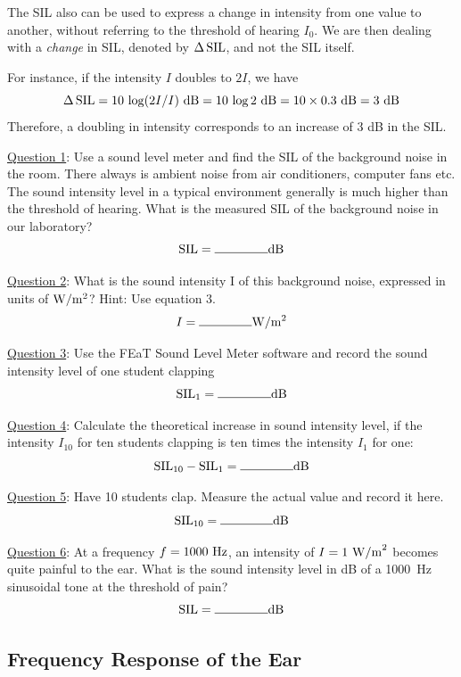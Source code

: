 \documentclass[11pt]{NSF}
\def\be{\begin{equation}}
\def\ee{\end{equation}}
\begin{document}
The SIL also can be used to express a change in intensity from one 
value to another, without referring to the threshold of hearing $I_0$. 
We are then dealing with a {\em change} in SIL, denoted by 
$\Delta\,{\rm SIL}$, and not the SIL itself. 

For instance, if the intensity $I$ doubles to $2I$, we have
%
\be
\Delta\,{\rm SIL} = 10\,\log (2I/I)~{\rm dB}
= 10\,\log 2~{\rm dB} 
= 10\times 0.3~{\rm dB} 
= 3~{\rm dB}
\ee
Therefore, a doubling in intensity corresponds to an increase of 3 dB in the SIL.


\underline{Question 1}: Use a sound level meter and find the SIL of the background noise in the room. There always is
ambient noise from air conditioners, computer fans etc. The sound intensity level in a typical
environment generally is much higher than the threshold of hearing. What is the measured SIL of
the background noise in our laboratory? 
$${\rm SIL}=\rule{1.5cm}{0.15mm}{\rm dB}$$

\underline{Question 2}: What is the sound intensity I of this background noise, expressed in units of ${\rm W}/{\rm m}^2$? Hint: Use equation 3.
$$I=\rule{1.5cm}{0.15mm}{\rm W}/{{\rm m}^2}$$

\underline{Question 3}: Use the FEaT Sound Level Meter software and record the sound intensity level of one student
clapping
$${\rm SIL}_1=\rule{1.5cm}{0.15mm}{\rm dB}$$

\underline{Question 4}: Calculate the theoretical increase in sound intensity level, if the intensity $I_{10}$ for ten students
clapping is ten times the intensity $I_1$ for one:
$${\rm SIL}_{10} - {\rm SIL}_1=\rule{1.5cm}{0.15mm}{\rm dB}$$

\underline{Question 5}: Have 10 students clap. Measure the actual value and record it here.
$${\rm SIL}_{10}=\rule{1.5cm}{0.15mm}{\rm dB}$$

\underline{Question 6}: At a frequency $f =1000~{\rm Hz}$, an intensity of $I = 1~{\rm W/m}^2$ 
becomes quite painful to the ear.
What is the sound intensity level in dB of a 1000~Hz sinusoidal 
tone at the threshold of pain?
$${\rm SIL}=\rule{1.5cm}{0.15mm}{\rm dB}$$


\subsection{Frequency Response of the Ear}
\end{document}
